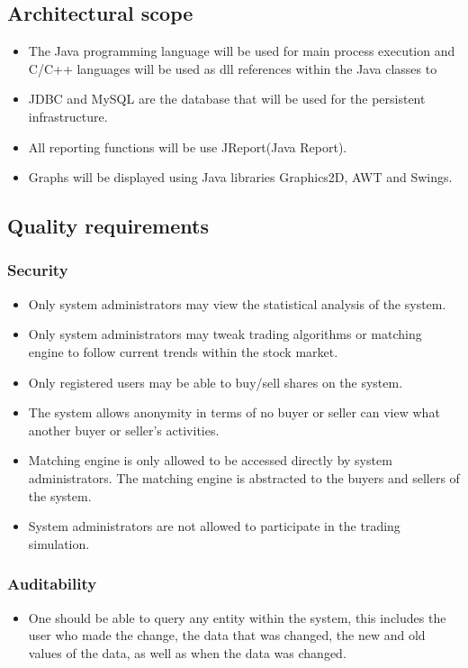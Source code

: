 \documentclass[12pt]{article}
\begin{document}
			    \subsection{Architectural scope}	
			    	   \begin{itemize}
			    	   		\item The Java programming language will be used for main process execution and C/C++ languages will be used as dll references within the Java classes to 
			    	   		\item JDBC and MySQL are the database that will be used for the persistent infrastructure. 
			    	   		\item All reporting functions will be use JReport(Java Report).
			    	   		\item Graphs will be displayed using Java libraries Graphics2D, AWT and Swings. 
			    	   \end{itemize}
			    
			    \subsection{Quality requirements}	
			    	\subsubsection{Security}
			    	\begin{itemize}
			    		\item Only system administrators may view the statistical analysis of the system. 
			    		\item Only system administrators may tweak trading algorithms or matching engine to follow current trends within the stock market.
				   		\item Only registered users may be able to buy/sell shares on the system.
			       		\item The system allows anonymity in terms of no buyer or seller can view what another buyer or seller’s activities.
			       		\item Matching engine is only allowed to be accessed directly by system administrators. The matching engine is abstracted to the buyers and sellers of the system.  
			       		\item System administrators are not allowed to participate in the trading simulation.
			    	\end{itemize}	
			    		
			    	\subsubsection{Auditability}
			    	\begin{itemize}
				    	\item One should be able to query any entity within the system, this includes the user who made the change, the data that was changed, the new and old values of the data, as well as when the data was changed.
			    	\end{itemize}
			    	
\end{document}
